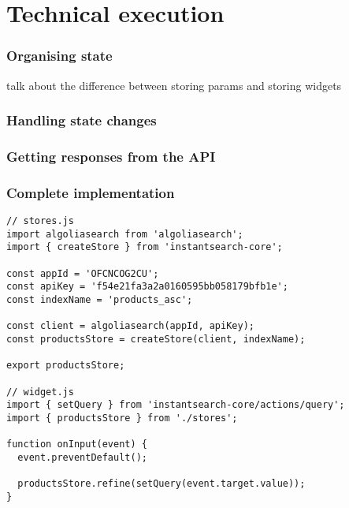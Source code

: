 
\section{Technical execution} %
\label{sec:execution}

\subsubsection{Organising state} %
\label{ssub:organising_state}

talk about the difference between storing params and storing widgets


\subsubsection{Handling state changes} %
\label{ssub:handling_state_changes}


\subsubsection{Getting responses from the API} %
\label{ssub:getting_responses_from_the_api}


\subsubsection{Complete implementation} %
\label{ssub:complete_implementation}

\begin{lstlisting}[caption={Using instantearch-core},label={lst:is-core-usage}]
// stores.js
import algoliasearch from 'algoliasearch';
import { createStore } from 'instantsearch-core';

const appId = 'OFCNCOG2CU';
const apiKey = 'f54e21fa3a2a0160595bb058179bfb1e';
const indexName = 'products_asc';

const client = algoliasearch(appId, apiKey);
const productsStore = createStore(client, indexName);

export productsStore;

// widget.js
import { setQuery } from 'instantsearch-core/actions/query';
import { productsStore } from './stores';

function onInput(event) {
  event.preventDefault();

  productsStore.refine(setQuery(event.target.value));
}
\end{lstlisting}


